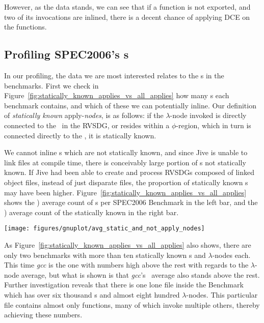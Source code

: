 However, as the data stands, we can see that if a function is not exported, and
two of its invocations are inlined, there is a decent chance of applying DCE on
the functions.

\subsection{Profiling SPEC2006's \applyNode s}
\label{sub:res:ic_profiling}

In our profiling, the data we are most interested relates to the \applyNode s in
the benchmarks. First we check in
Figure~\ref{fig:statically_known_applies_vs_all_applies} how many \applyNode s
each benchmark contains, and which of these we can potentially inline. Our
definition of \textit{statically known} apply-\textit{nodes}, is as follows: if
the $\lambda$-node invoked is directly connected to the \applyNode~in the RVSDG,
or resides within a $\phi$-region, which in turn is connected directly to the
\applyNode , it is statically known.

We cannot inline \applyNode s which are not statically known, and since Jive is
unable to link files at compile time, there is conceivably large portion of
\applyNode s not statically known. If Jive had been able to create and process
RVSDGs composed of linked object files, instead of just disparate files, the
proportion of statically known \applyNode s may have been higher.
Figure~\ref{fig:statically_known_applies_vs_all_applies} shows the )
average count of \applyNode s per SPEC2006 Benchmark in the left bar, and the
) average count of the statically known in the right bar.

\begin{centering}
	\noindent\begin{minipage}{\textwidth}
		\captionsetup{type=figure}
		\hspace{-1em}
		\texttt{[image: figures/gnuplot/avg\_static\_and\_not\_apply\_nodes]}
	\end{minipage}
	\label{fig:statically_known_applies_vs_all_applies}
\end{centering}

As Figure~\ref{fig:statically_known_applies_vs_all_applies} also shows, there
are only two benchmarks with more than ten statically known \applyNode s and
$\lambda$-nodes each. This time \textit{gcc} is the one with numbers high above
the rest with regards to the $\lambda$-node average, but what is shown is that
\textit{gcc}'s \applyNode~average also stands above the rest. Further
investigation reveals that there is one lone file inside the Benchmark which has
over six thousand \applyNode s and almost eight hundred $\lambda$-nodes. This
particular file contains almost only functions, many of which invoke multiple
others, thereby achieving these numbers.

